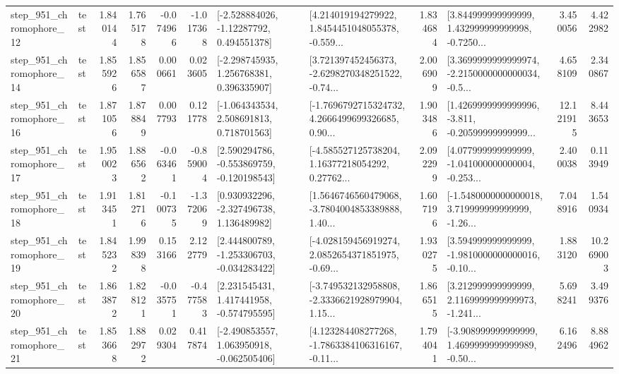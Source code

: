\begin{tabular}{llrrrrllrlrr}
  step\_951\_chromophore\_12 &      test &      1.840144 &    1.765178 &     -0.074966 & -1.017368 &    [-2.528884026, -1.12287792, 0.494551378] &  [4.214019194279922, 1.8454451048055378, -0.559... &       1.834684 &  [3.844999999999999, 1.432999999999998, -0.7250... &            3.450056 &          4.422982 \\
  step\_951\_chromophore\_14 &      test &      1.855926 &    1.856587 &      0.000661 &  0.023605 &    [-2.298745935, 1.256768381, 0.396335907] &  [3.721397452456373, -2.6298270348251522, -0.74... &       2.006909 &  [3.3699999999999974, -2.2150000000000034, -0.5... &            4.658109 &          2.340867 \\
  step\_951\_chromophore\_16 &      test &      1.871056 &    1.878849 &      0.007793 &  0.121778 &    [-1.064343534, 2.508691813, 0.718701563] &  [-1.7696792715324732, 4.2666499699326685, 0.90... &       1.903486 &  [1.4269999999999996, -3.811, -0.20599999999999... &           12.121915 &          8.443653 \\
  step\_951\_chromophore\_17 &      test &      1.950023 &    1.886562 &     -0.063461 & -0.859004 &   [2.590294786, -0.553869759, -0.120198543] &  [-4.585527125738204, 1.16377218054292, 0.27762... &       2.092299 &  [4.077999999999999, -1.041000000000004, -0.253... &            2.400038 &          0.113949 \\
  step\_951\_chromophore\_18 &      test &      1.913451 &    1.812716 &     -0.100735 & -1.372069 &    [0.930932296, -2.327496738, 1.136489982] &  [1.5646746560479068, -3.7804004853389888, 1.40... &       1.607196 &  [-1.5480000000000018, 3.719999999999999, -1.26... &            7.048916 &          1.540934 \\
  step\_951\_chromophore\_19 &      test &      1.845232 &    1.998398 &      0.153166 &  2.122779 &   [2.444800789, -1.253306703, -0.034283422] &  [-4.028159456919274, 2.0852654371851975, -0.69... &       1.930275 &  [3.594999999999999, -1.9810000000000016, -0.10... &            1.883120 &         10.269003 \\
  step\_951\_chromophore\_20 &      test &      1.863872 &    1.828121 &     -0.035751 & -0.477583 &    [2.231545431, 1.417441958, -0.574795595] &  [-3.749532132958808, -2.3336621928979904, 1.15... &       1.866515 &  [3.212999999999999, 2.1169999999999973, -1.241... &            5.698241 &          3.499376 \\
  step\_951\_chromophore\_21 &      test &      1.853668 &    1.882972 &      0.029304 &  0.417874 &   [-2.490853557, 1.063950918, -0.062505406] &  [4.123284408277268, -1.7863384106316167, -0.11... &       1.794041 &  [-3.908999999999999, 1.4699999999999989, -0.50... &            6.162496 &          8.884962 \\

\end{tabular}
